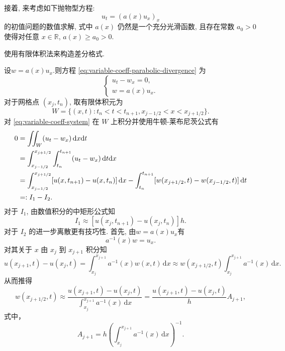接着, 来考虑如下抛物型方程:
\begin{equation}\label{eq:variable-coeff-parabolic-divergence}
    u_t = (a(x)u_x)_x
\end{equation}
的初值问题的数值求解, 式中 $a(x)$ 仍然是一个充分光滑函数, 且存在常数 $a_0 > 0$ 使得对任意 $x \in \mathbb{R}$, $a(x) \geq a_0 > 0$. \par
使用有限体积法来构造差分格式. \par
\noindent{} 设$w = a(x)u_x$.则方程 \eqref{eq:variable-coeff-parabolic-divergence} 为
\begin{equation}\label{eq:variable-coeff-system}
    \begin{cases}
        u_t - w_x = 0,\\
        w=a(x)u_x.
    \end{cases}
\end{equation}
\noindent{}
对于网格点 $(x_j, t_n)$, 取有限体积元为
\begin{equation*}
    W = \{ (x,t) : t_n < t < t_{n+1}, x_{j-1/2} < x < x_{j+1/2} \}.
\end{equation*}
对 \eqref{eq:variable-coeff-system} 在 $W$ 上积分并使用牛顿-莱布尼茨公式有
\begin{align}\label{eq:finite-volume-integral}
    0 &= \iint_W (u_t - w_x) \,\mathrm{d}x\mathrm{d}t \notag \\
    &= \int_{x_{j-1/2}}^{x_{j+1/2}} \int_{t_n}^{t_{n+1}} (u_t - w_x) \,\mathrm{d}t \mathrm{d}x \notag \\
    &= \int_{x_{j-1/2}}^{x_{j+1/2}} [u(x, t_{n+1}) - u(x, t_n)] \,\mathrm{d}x - \int_{t_n}^{t_{n+1}} [w(x_{j+1/2}, t) - w(x_{j-1/2}, t)] \,\mathrm{d}t \notag \\
    &=: I_1 - I_2.
\end{align}
对于 $I_1$, 由数值积分的中矩形公式知
\begin{equation}\label{eq:I1-approx}
    I_1 \approx [u(x_j, t_{n+1}) - u(x_j, t_n)]h.
\end{equation}
对于 $I_2$ 的进一步离散更有技巧性. 首先, 由$w=a(x)u_x$有
\begin{equation*}
    a^{-1}(x)w = u_x.
\end{equation*}
对其关于 $x$ 由 $x_j$ 到 $x_{j+1}$ 积分知
\begin{equation*}
    u(x_{j+1}, t) - u(x_j, t) = \int_{x_j}^{x_{j+1}} a^{-1}(x)w(x,t) \,\mathrm{d}x \approx w(x_{j+1/2}, t) \int_{x_j}^{x_{j+1}} a^{-1}(x) \,\mathrm{d}x.
\end{equation*}
从而推得
\begin{equation}\label{eq:5.8}
    w(x_{j+1/2}, t) \approx \frac{u(x_{j+1}, t) - u(x_j, t)}{\int_{x_j}^{x_{j+1}} a^{-1}(x) \,\mathrm{d}x} = \frac{u(x_{j+1}, t) - u(x_j, t)}{h} A_{j+1},
\end{equation}
式中，
\begin{equation*}
    A_{j+1} = h\left(\int_{x_j}^{x_{j+1}} a^{-1}(x) \,\mathrm{d}x\right)^{-1}.
\end{equation*}


